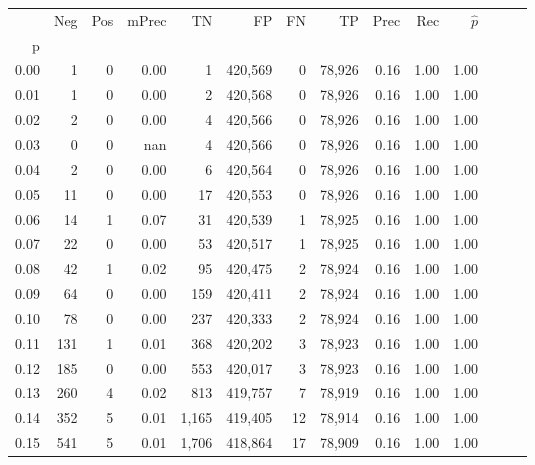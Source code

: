 \begin{tabular}{rrrrrrrrrrrrrr}
\toprule
{} &     Neg &    Pos & mPrec &       TN &       FP &      FN &      TP &  Prec &   Rec & $\hat{p}$ \\
p    &         &        &       &          &          &         &         &       &       &           \\
\midrule
0.00 &       1 &      0 &  0.00 &        1 &  420,569 &       0 &  78,926 &  0.16 &  1.00 &      1.00 \\
0.01 &       1 &      0 &  0.00 &        2 &  420,568 &       0 &  78,926 &  0.16 &  1.00 &      1.00 \\
0.02 &       2 &      0 &  0.00 &        4 &  420,566 &       0 &  78,926 &  0.16 &  1.00 &      1.00 \\
0.03 &       0 &      0 &   nan &        4 &  420,566 &       0 &  78,926 &  0.16 &  1.00 &      1.00 \\
0.04 &       2 &      0 &  0.00 &        6 &  420,564 &       0 &  78,926 &  0.16 &  1.00 &      1.00 \\
0.05 &      11 &      0 &  0.00 &       17 &  420,553 &       0 &  78,926 &  0.16 &  1.00 &      1.00 \\
0.06 &      14 &      1 &  0.07 &       31 &  420,539 &       1 &  78,925 &  0.16 &  1.00 &      1.00 \\
0.07 &      22 &      0 &  0.00 &       53 &  420,517 &       1 &  78,925 &  0.16 &  1.00 &      1.00 \\
0.08 &      42 &      1 &  0.02 &       95 &  420,475 &       2 &  78,924 &  0.16 &  1.00 &      1.00 \\
0.09 &      64 &      0 &  0.00 &      159 &  420,411 &       2 &  78,924 &  0.16 &  1.00 &      1.00 \\
0.10 &      78 &      0 &  0.00 &      237 &  420,333 &       2 &  78,924 &  0.16 &  1.00 &      1.00 \\
0.11 &     131 &      1 &  0.01 &      368 &  420,202 &       3 &  78,923 &  0.16 &  1.00 &      1.00 \\
0.12 &     185 &      0 &  0.00 &      553 &  420,017 &       3 &  78,923 &  0.16 &  1.00 &      1.00 \\
0.13 &     260 &      4 &  0.02 &      813 &  419,757 &       7 &  78,919 &  0.16 &  1.00 &      1.00 \\
0.14 &     352 &      5 &  0.01 &    1,165 &  419,405 &      12 &  78,914 &  0.16 &  1.00 &      1.00 \\
0.15 &     541 &      5 &  0.01 &    1,706 &  418,864 &      17 &  78,909 &  0.16 &  1.00 &      1.00 \\

\end{tabular}
